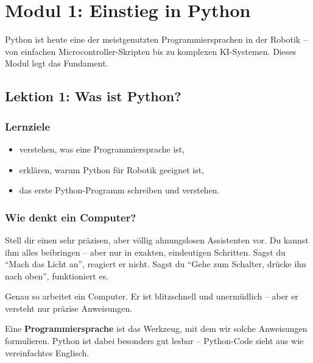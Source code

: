 \chapter{Modul 1: Einstieg in Python}

Python ist heute eine der meistgenutzten Programmiersprachen in der Robotik -- von einfachen Microcontroller-Skripten bis zu komplexen KI-Systemen. Dieses Modul legt das Fundament.

\section{Lektion 1: Was ist Python?}

\subsection*{Lernziele}
\begin{itemize}
    \item verstehen, was eine Programmiersprache ist,
    \item erklären, warum Python für Robotik geeignet ist,
    \item das erste Python-Programm schreiben und verstehen.
\end{itemize}

\subsection*{Wie denkt ein Computer?}

\begin{analogie}
Stell dir einen sehr präzisen, aber völlig ahnungslosen Assistenten vor. Du kannst ihm alles beibringen -- aber nur in exakten, eindeutigen Schritten. Sagst du ``Mach das Licht an'', reagiert er nicht. Sagst du ``Gehe zum Schalter, drücke ihn nach oben'', funktioniert es.

Genau so arbeitet ein Computer. Er ist blitzschnell und unermüdlich -- aber er versteht nur präzise Anweisungen.
\end{analogie}

Eine \textbf{Programmiersprache} ist das Werkzeug, mit dem wir solche Anweisungen formulieren. Python ist dabei besonders gut lesbar -- Python-Code sieht aus wie vereinfachtes Englisch.

